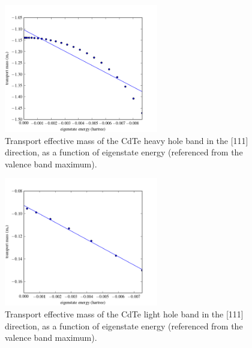 \begin{figure}[htb]
\includegraphics[width=0.6\textwidth]{./figures/ch4/mt_E_hh.png}
\caption{\label{mt_E_hh}Transport effective mass of the CdTe heavy hole band in the [111] direction, as a function of eigenstate energy (referenced from the valence band maximum).}
\end{figure}

\begin{figure}[htb]
\includegraphics[width=0.6\textwidth]{./figures/ch4//mt_E_lh.png}
\caption{\label{mt_E_lh}Transport effective mass of the CdTe light hole band in the [111] direction, as a function of eigenstate energy (referenced from the valence band maximum).}
\end{figure}


